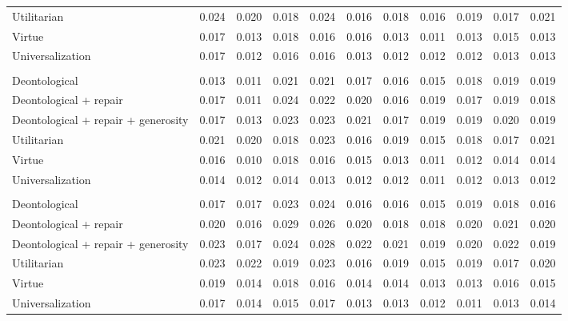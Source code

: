 \begin{table}[t]
\begin{tabular}{lrrrrrrrrrr}
Utilitarian & 0.024 & 0.020 & 0.018 & 0.024 & 0.016 & 0.018 & 0.016 & 0.019 & 0.017 & 0.021 \\
Virtue & 0.017 & 0.013 & 0.018 & 0.016 & 0.016 & 0.013 & 0.011 & 0.013 & 0.015 & 0.013 \\
Universalization & 0.017 & 0.012 & 0.016 & 0.016 & 0.013 & 0.012 & 0.012 & 0.012 & 0.013 & 0.013 \\
\addlinespace
\multicolumn{11}{l}{\emph{Stag Hunt}} \\
Deontological & 0.013 & 0.011 & 0.021 & 0.021 & 0.017 & 0.016 & 0.015 & 0.018 & 0.019 & 0.019 \\
Deontological + repair & 0.017 & 0.011 & 0.024 & 0.022 & 0.020 & 0.016 & 0.019 & 0.017 & 0.019 & 0.018 \\
Deontological + repair + generosity & 0.017 & 0.013 & 0.023 & 0.023 & 0.021 & 0.017 & 0.019 & 0.019 & 0.020 & 0.019 \\
Utilitarian & 0.021 & 0.020 & 0.018 & 0.023 & 0.016 & 0.019 & 0.015 & 0.018 & 0.017 & 0.021 \\
Virtue & 0.016 & 0.010 & 0.018 & 0.016 & 0.015 & 0.013 & 0.011 & 0.012 & 0.014 & 0.014 \\
Universalization & 0.014 & 0.012 & 0.014 & 0.013 & 0.012 & 0.012 & 0.011 & 0.012 & 0.013 & 0.012 \\
\addlinespace
\multicolumn{11}{l}{\emph{Chicken}} \\
Deontological & 0.017 & 0.017 & 0.023 & 0.024 & 0.016 & 0.016 & 0.015 & 0.019 & 0.018 & 0.016 \\
Deontological + repair & 0.020 & 0.016 & 0.029 & 0.026 & 0.020 & 0.018 & 0.018 & 0.020 & 0.021 & 0.020 \\
Deontological + repair + generosity & 0.023 & 0.017 & 0.024 & 0.028 & 0.022 & 0.021 & 0.019 & 0.020 & 0.022 & 0.019 \\
Utilitarian & 0.023 & 0.022 & 0.019 & 0.023 & 0.016 & 0.019 & 0.015 & 0.019 & 0.017 & 0.020 \\
Virtue & 0.019 & 0.014 & 0.018 & 0.016 & 0.014 & 0.014 & 0.013 & 0.013 & 0.016 & 0.015 \\
Universalization & 0.017 & 0.014 & 0.015 & 0.017 & 0.013 & 0.013 & 0.012 & 0.011 & 0.013 & 0.014 \\
\bottomrule
\end{tabular}
\end{table}
